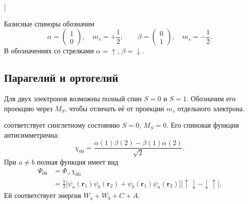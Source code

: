 \documentclass[../final.tex]{subfiles}
\begin{document}
\begin{rbox}{[}
\end{rbox}

Базисные спиноры обозначим
\begin{equation*}
    \alpha=\begin{pmatrix}1\\0\end{pmatrix},
    \quad m_s=+\frac12;
    \qquad
    \beta=\begin{pmatrix}0\\1\end{pmatrix},
    \quad m_s=-\frac12.
\end{equation*}
В обозначениях со стрелками \(\alpha=\uparrow\), \(\beta=\downarrow\).

\subsection{Парагелий и ортогелий}

Для двух электронов возможны полный спин \(S=0\) и \(S=1\).
Обозначим его проекцию через \(M_S\), чтобы отличать её от проекции
\(m_s\) отдельного электрона.

 соответствует синглетному состоянию
\(S=0\), \(M_S=0\). Его спиновая функция антисимметрична:
\begin{equation*}
    \chi_{00}=\frac{\alpha(1)\beta(2)-\beta(1)\alpha(2)}{\sqrt2}.
\end{equation*}
При \(a\ne b\) полная функция имеет вид
\begin{align*}
    \Psi_{00}
    &=\Phi_+\chi_{00}\\
    &=\frac12\bigl[\psi_a(\mathbf r_1)\psi_b(\mathbf r_2)
       +\psi_b(\mathbf r_1)\psi_a(\mathbf r_2)\bigr]
       \bigl[\uparrow\downarrow-\downarrow\uparrow\bigr].
\end{align*}
Ей соответствует энергия \(W_a+W_b+C+A\).
\end{document}
